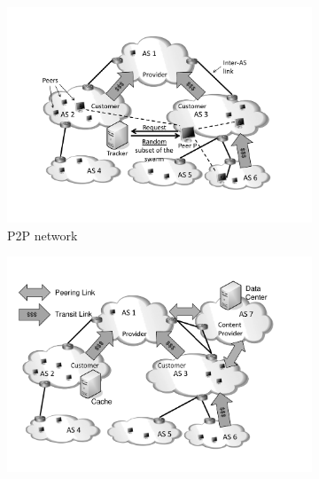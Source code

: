 

\begin{figure}[bt]
	\centering
\vspace{-0.2cm}
\hspace{-0.5cm}
	\begin{subfigure}[b]{0.54\textwidth}
	  \includegraphics[width=\textwidth]{aslevel/figs/p2p}
    \vspace{-0.5cm}
    \caption{P2P network}
    \label{fig:aslevel:p2p}
  \end{subfigure}
\hspace{-0.5cm}
	\begin{subfigure}[b]{0.54\textwidth}
	 	\includegraphics[width=\textwidth]{aslevel/figs/cdn}

\end{subfigure}
\end{figure}
